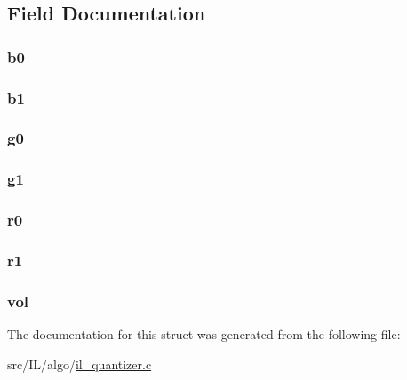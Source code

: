 \subsection{Field Documentation}
\hypertarget{struct_box_ac1dc5f6d02f50c776c0fba71efc4a650}{
\subsubsection[{b0}]{ b0}}\label{struct_box_ac1dc5f6d02f50c776c0fba71efc4a650}
\hypertarget{struct_box_a36415d264aaec3c5e9e924ca7b2ba381}{
\subsubsection[{b1}]{ b1}}\label{struct_box_a36415d264aaec3c5e9e924ca7b2ba381}
\hypertarget{struct_box_a362f13530ace2415e961b9dfa6f6d109}{
\subsubsection[{g0}]{ g0}}\label{struct_box_a362f13530ace2415e961b9dfa6f6d109}
\hypertarget{struct_box_a16c0da73057f4e03164e87b298e6a78f}{
\subsubsection[{g1}]{ g1}}\label{struct_box_a16c0da73057f4e03164e87b298e6a78f}
\hypertarget{struct_box_af63ccc2b282f14259f7e6dc1ed56e80f}{
\subsubsection[{r0}]{ r0}}\label{struct_box_af63ccc2b282f14259f7e6dc1ed56e80f}
\hypertarget{struct_box_ad8e3855e48612f60e080c24c97bd0039}{
\subsubsection[{r1}]{ r1}}\label{struct_box_ad8e3855e48612f60e080c24c97bd0039}
\hypertarget{struct_box_a2d37aaf53616f8526c571cefa4555013}{
\subsubsection[{vol}]{ vol}}\label{struct_box_a2d37aaf53616f8526c571cefa4555013}


The documentation for this struct was generated from the following file\-:\begin{DoxyCompactItemize}
\item 
src/\-I\-L/algo/\hyperlink{il__quantizer_8c}{il\-\_\-quantizer.\-c}\end{DoxyCompactItemize}
